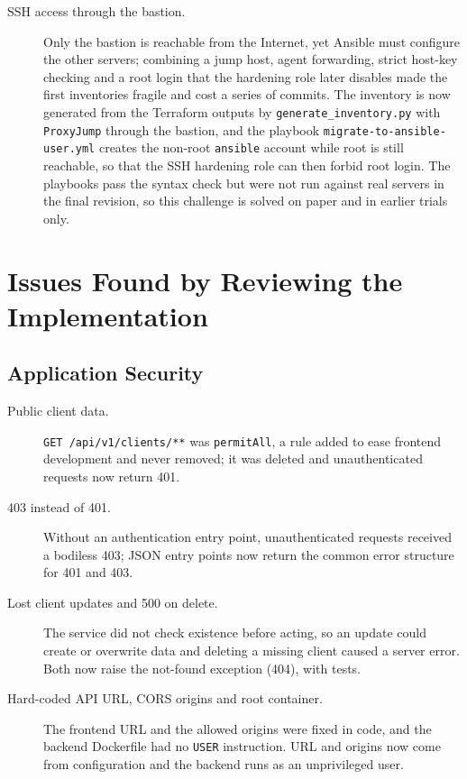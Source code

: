 \begin{description}
  \item[SSH access through the bastion.] Only the bastion is reachable from the Internet, yet Ansible must configure the other servers; combining a jump host, agent forwarding, strict host-key checking and a root login that the hardening role later disables made the first inventories fragile and cost a series of commits. The inventory is now generated from the Terraform outputs by \texttt{generate\_inventory.py} with \texttt{ProxyJump} through the bastion, and the playbook \texttt{migrate-to-ansible-user.yml} creates the non-root \texttt{ansible} account while root is still reachable, so that the SSH hardening role can then forbid root login. The playbooks pass the syntax check but were not run against real servers in the final revision, so this challenge is solved on paper and in earlier trials only.
\end{description}

\section{Issues Found by Reviewing the Implementation}

\subsection{Application Security}
\begin{description}
  \item[Public client data.] \texttt{GET /api/v1/clients/**} was \texttt{permitAll}, a rule added to ease frontend development and never removed; it was deleted and unauthenticated requests now return 401.
  \item[403 instead of 401.] Without an authentication entry point, unauthenticated requests received a bodiless 403; JSON entry points now return the common error structure for 401 and 403.
  \item[Lost client updates and 500 on delete.] The service did not check existence before acting, so an update could create or overwrite data and deleting a missing client caused a server error. Both now raise the not-found exception (404), with tests.
  \item[Hard-coded API URL, CORS origins and root container.] The frontend URL and the allowed origins were fixed in code, and the backend Dockerfile had no \texttt{USER} instruction. URL and origins now come from configuration and the backend runs as an unprivileged user.
\end{description}

